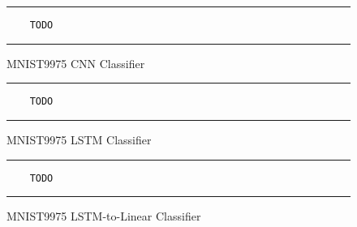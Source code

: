 \begin{figure}
  \caption{MNIST9975 CNN Classifier}
  \label{fig:cnnMNISTCNN}
  \par\noindent\rule{\textwidth}{0.5pt}
  \begin{\codefigsize}
  \begin{lstlisting}
    TODO
  \end{lstlisting}
  \end{\codefigsize}
  \par\noindent\rule{\textwidth}{0.5pt}
\end{figure}

\begin{figure}
  \caption{MNIST9975 LSTM Classifier}
  \label{fig:cnnMNISTCNNLSTM}
  \par\noindent\rule{\textwidth}{0.5pt}
  \begin{\codefigsize}
  \begin{lstlisting}
    TODO
  \end{lstlisting}
  \end{\codefigsize}
  \par\noindent\rule{\textwidth}{0.5pt}
\end{figure}

\begin{figure}
  \caption{MNIST9975 LSTM-to-Linear Classifier}
  \label{fig:cnnMNISTCNNLSTM2Linear}
  \par\noindent\rule{\textwidth}{0.5pt}
  \begin{\codefigsize}
  \begin{lstlisting}
    TODO
  \end{lstlisting}
  \end{\codefigsize}
  \par\noindent\rule{\textwidth}{0.5pt}
\end{figure}
